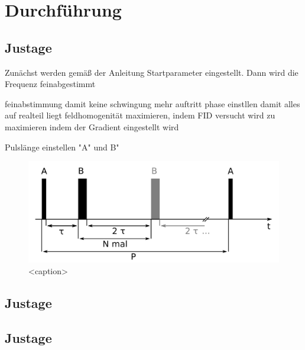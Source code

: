 \section{Durchführung}
\label{sec:Durchführung}

\subsection{Justage}

    Zunächst werden gemäß der Anleitung Startparameter eingestellt.
    Dann wird die Frequenz feinabgestimmt

    feinabstimmung damit keine schwingung mehr auftritt
    phase einstllen damit alles auf realteil liegt
    feldhomogenität maximieren, indem FID versucht wird zu maximieren 
    indem der Gradient eingestellt wird

    Pulslänge einstellen "A" und B"

    \begin{figure}[htbp]
        \centering
        \includegraphics[width=\textwidth]{figures/pulsprogramm.png}
        \caption{<caption>}
        \label{<label>}
    \end{figure}

    

\subsection{}
\subsection{Justage}
\subsection{Justage}

